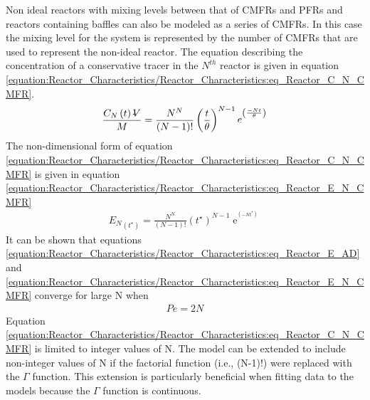 \documentclass[letterpaper,10pt,english]{sphinxmanual}
\begin{document}
Non ideal reactors with mixing levels between that of CMFRs and PFRs and reactors containing baffles can also be modeled as a series of CMFRs. In this case the mixing level for the system is represented by the number of CMFRs that are used to represent the non-ideal reactor. The equation describing the concentration of a conservative tracer in the \(N^{th}\) reactor is given in equation \eqref{equation:Reactor_Characteristics/Reactor_Characteristics:eq_Reactor_C_N_CMFR}.
\begin{equation}\label{equation:Reactor_Characteristics/Reactor_Characteristics:eq_Reactor_C_N_CMFR}
\begin{split} \frac{C_{N} \left(t\right)\rlap{-} V }{M} =\frac{N^N}{\left(N-1\right)!} \left(\frac{t}{\theta} \right)^{N-1} {\mathop{e}\nolimits^{{}^{\left(\frac{-Nt}{\theta} \right)} }}\end{split}
\end{equation}
The non-dimensional form of equation \eqref{equation:Reactor_Characteristics/Reactor_Characteristics:eq_Reactor_C_N_CMFR} is given in equation \eqref{equation:Reactor_Characteristics/Reactor_Characteristics:eq_Reactor_E_N_CMFR}
\begin{equation}\label{equation:Reactor_Characteristics/Reactor_Characteristics:eq_Reactor_E_N_CMFR}
\begin{split} {E_{N}}_{\left(t^{\star} \right)} = \frac{N^N}{\left(N-1\right)!} \left(t^{\star} \right)^{N-1} {\mathop{e}\nolimits^{{}^{\left(-Nt^{\star} \right)} }}\end{split}
\end{equation}
It can be shown that equations \eqref{equation:Reactor_Characteristics/Reactor_Characteristics:eq_Reactor_E_AD} and \eqref{equation:Reactor_Characteristics/Reactor_Characteristics:eq_Reactor_E_N_CMFR} converge for large N when
\begin{equation}\label{equation:Reactor_Characteristics/Reactor_Characteristics:Reactor_Characteristics/Reactor_Characteristics:10}
\begin{split}Pe=2N\end{split}
\end{equation}
Equation \eqref{equation:Reactor_Characteristics/Reactor_Characteristics:eq_Reactor_C_N_CMFR} is limited to integer values of N. The model can be extended to include non-integer values of N if the factorial function (i.e., (N-1)!) were replaced with the \(\Gamma\) function. This extension is particularly beneficial when fitting data to the models because the \(\Gamma\) function is continuous.
\end{document}
